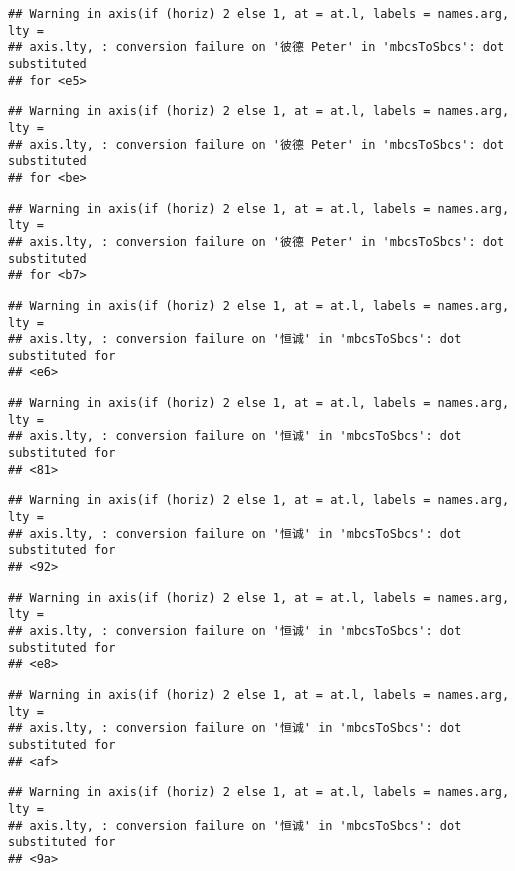 \documentclass[
]{article}
\begin{document}
\begin{verbatim}
## Warning in axis(if (horiz) 2 else 1, at = at.l, labels = names.arg, lty =
## axis.lty, : conversion failure on '彼德 Peter' in 'mbcsToSbcs': dot substituted
## for <e5>
\end{verbatim}

\begin{verbatim}
## Warning in axis(if (horiz) 2 else 1, at = at.l, labels = names.arg, lty =
## axis.lty, : conversion failure on '彼德 Peter' in 'mbcsToSbcs': dot substituted
## for <be>
\end{verbatim}

\begin{verbatim}
## Warning in axis(if (horiz) 2 else 1, at = at.l, labels = names.arg, lty =
## axis.lty, : conversion failure on '彼德 Peter' in 'mbcsToSbcs': dot substituted
## for <b7>
\end{verbatim}

\begin{verbatim}
## Warning in axis(if (horiz) 2 else 1, at = at.l, labels = names.arg, lty =
## axis.lty, : conversion failure on '恒诚' in 'mbcsToSbcs': dot substituted for
## <e6>
\end{verbatim}

\begin{verbatim}
## Warning in axis(if (horiz) 2 else 1, at = at.l, labels = names.arg, lty =
## axis.lty, : conversion failure on '恒诚' in 'mbcsToSbcs': dot substituted for
## <81>
\end{verbatim}

\begin{verbatim}
## Warning in axis(if (horiz) 2 else 1, at = at.l, labels = names.arg, lty =
## axis.lty, : conversion failure on '恒诚' in 'mbcsToSbcs': dot substituted for
## <92>
\end{verbatim}

\begin{verbatim}
## Warning in axis(if (horiz) 2 else 1, at = at.l, labels = names.arg, lty =
## axis.lty, : conversion failure on '恒诚' in 'mbcsToSbcs': dot substituted for
## <e8>
\end{verbatim}

\begin{verbatim}
## Warning in axis(if (horiz) 2 else 1, at = at.l, labels = names.arg, lty =
## axis.lty, : conversion failure on '恒诚' in 'mbcsToSbcs': dot substituted for
## <af>
\end{verbatim}

\begin{verbatim}
## Warning in axis(if (horiz) 2 else 1, at = at.l, labels = names.arg, lty =
## axis.lty, : conversion failure on '恒诚' in 'mbcsToSbcs': dot substituted for
## <9a>
\end{verbatim}
\end{document}
